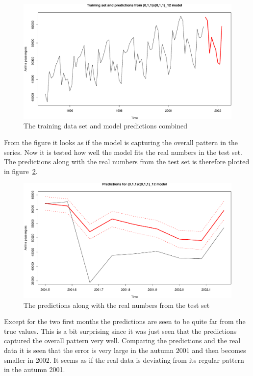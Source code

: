 \begin{figure}[!ht]
    \centering
    \includegraphics[width=120mm]{../plots/training-and-prediction.pdf}
    \caption{The training data set and model predictions combined}
    \label{fig:training-and-prediction}
\end{figure}

From the figure it looks as if the model is capturing the overall pattern in
the series. Now it is tested how well the model fits the real numbers in the
test set. The predictions along with the real numbers from the test set is
therefore plotted in figure~\ref{fig:test-and-prediction}. \par

\begin{figure}[!ht]
    \centering
    \includegraphics[width=120mm]{../plots/test-and-prediction.pdf}
    \caption{The predictions along with the real numbers from the test set}
    \label{fig:test-and-prediction}
\end{figure}

Except for the two first months the predictions are seen to be quite far from
the true values. This is a bit surprising since it was just seen that the
predictions captured the overall pattern very well. Comparing the predictions
and the real data it is seen that the error is very large in the autumn 2001
and then becomes smaller in 2002. It seems as if the real data is deviating
from its regular pattern in the autumn 2001. \par

